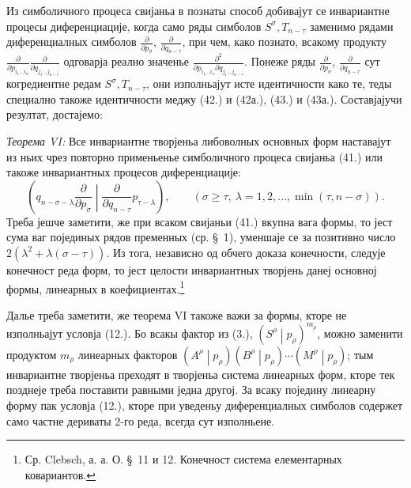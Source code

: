 ﻿\documentclass[11pt]{article}
\newcommand{\pair}[2]{\left(#1\middle|#2\right)}
\begin{document}
Из симболичного процеса свијаньа в познаты способ добивајут се инвариантне процесы диференциације, когда само ряды симболов $S^\sigma,T_{n-\tau}$ заменимо рядами диференциалных симболов $\frac{\partial}{\partial p_\sigma}$, $\frac{\partial}{\partial q_{n-\tau}}$, при чем, како познато, всакому продукту $\frac{\partial}{\partial p_{i_1\ldots i_\sigma}}\frac{\partial}{\partial q_{j_1\ldots j_{n-\tau}}}$ одговарја реално значенье $\frac{\partial^2}{\partial p_{i_1\ldots i_\sigma}\partial q_{j_1\ldots j_{n-\tau}}}$. Понеже ряды $\frac{\partial}{\partial p_\sigma}$, $\frac{\partial}{\partial q_{n-\tau}}$ сут когредиентне редам $S^\sigma,T_{n-\tau}$, они изполньајут исте идентичности како те, теды специално такоже идентичности меджу (42.) и (42а.), (43.) и (43а.). Составјајучи резултат, достајемо:

\emph{Теорема VI:} Все инвариантне творјеньа либоволных основных форм наставајут из ньих чрез повторно применьенье симболичного процеса свијаньа (41.) или такоже инвариантных процесов диференциације:
\begin{equation}
 \left(q_{n-\sigma-\lambda}\frac{\partial}{\partial p_\sigma}
 \middle|\frac{\partial}{\partial q_{n-\tau}}p_{\tau-\lambda}\right),
 \qquad(\sigma\ge\tau,\ \lambda=1,2,\ldots,\min(\tau,n-\sigma)).
\tag{45}
\end{equation}
Треба јешче заметити, же при всаком свијаньи (41.) вкупна вага формы, то јест сума ваг појединых рядов пременных (ср. \S\ 1), уменшаје се за позитивно число $2(\lambda^2+\lambda(\sigma-\tau))$. Из тога, независно од обчего доказа конечности, следује конечност реда форм, то јест целости инвариантных творјень данеј основној формы, линеарных в коефициентах.\footnote{Ср. Clebsch, а. а. О. \S\ 11 и 12. Конечност система елементарных ковариантов.}

Далье треба заметити, же теорема VI такоже важи за формы, кторе не изполньајут условја (12.). Бо всакы фактор из (3.), $\pair{S^\rho}{p_\rho}^{m_\rho}$, можно заменити продуктом $m_\rho$ линеарных факторов $\pair{A^\rho}{p_\rho}\pair{B^\rho}{p_\rho}\cdots\pair{M^\rho}{p_\rho}$; тым инвариантне творјеньа преходят в творјеньа система линеарных форм, кторе тек позднеје треба поставити равными једна другој. За всаку поједину линеарну форму пак условја (12.), кторе при уведеньу диференциалных симболов содержет само частне дериваты 2-го реда, всегда сут изполньене.
\end{document}
